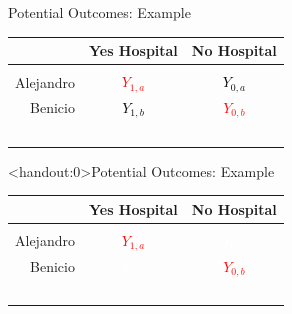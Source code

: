 \documentclass[10pt,xcolor=table,ignorenonframetext,handout,aspectratio=169]{beamer}
\begin{document}

\begin{frame}{Potential Outcomes:  Example}

\medskip
\begin{center}
\begin{tabular}{rcc}
 & \textbf{Yes Hospital} & \textbf{No Hospital} \\ [0.4ex] \hline
 & & \\ [-1.2ex]
Alejandro 	& \textcolor{red}{$Y_{1,a}$} 	& \textcolor{black}{$Y_{0,a}$} \\ [1.2ex] 
Benicio 	& \textcolor{black}{$Y_{1,b}$}						& \textcolor{red}{$Y_{0,b}$} \\ [0.8ex] \hline
	& \multicolumn{1}{p{1.6cm}}{$\ $} & \multicolumn{1}{p{1.6cm}}{$\ $} \\
\end{tabular}
\end{center}

\end{frame}



\begin{frame}<handout:0>{Potential Outcomes:  Example}

\medskip
\begin{center}
	\begin{tabular}{rcc}
		& \textbf{Yes Hospital} & \textbf{No Hospital} \\ [0.4ex] \hline
		& & \\ [-1.2ex]
		Alejandro 	& \textcolor{red}{$Y_{1,a}$} 	& \textcolor{white}{$Y_{0,a}$} \\ [1.2ex] 
		Benicio 	& \textcolor{white}{$Y_{1,b}$}						& \textcolor{red}{$Y_{0,b}$} \\ [0.8ex] \hline
		& \multicolumn{1}{p{1.6cm}}{$\ $} & \multicolumn{1}{p{1.6cm}}{$\ $} \\
	\end{tabular}
\end{center}

\end{frame}



\end{document}
